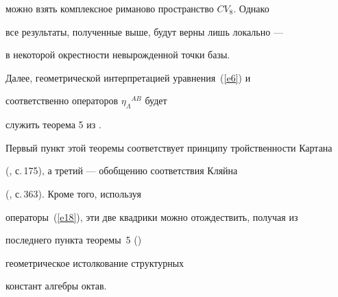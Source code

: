можно взять комплексное риманово пространство $CV_8$. Однако


все результаты, полученные выше, будут верны лишь локально ---


в некоторой окрестности невырожденной точки базы.


Далее, геометрической интерпретацией уравнения~(\ref{e6}) и


соответственно операторов $\eta_\Lambda{}^{AB}$ будет


служить теорема 5 из \cite{Andreev2}.





Первый пункт этой теоремы соответствует принципу тройственности Картана


(\cite{Cartan1}, с.\,175), а третий --- обобщению соответствия Кляйна


(\cite{Penrose1}, с.\,363). Кроме того, используя


операторы~(\ref{e18}), эти две квадрики можно отождествить, получая из


последнего пункта теоремы~5 (\cite{Andreev2})




геометрическое истолкование структурных


констант алгебры октав.





